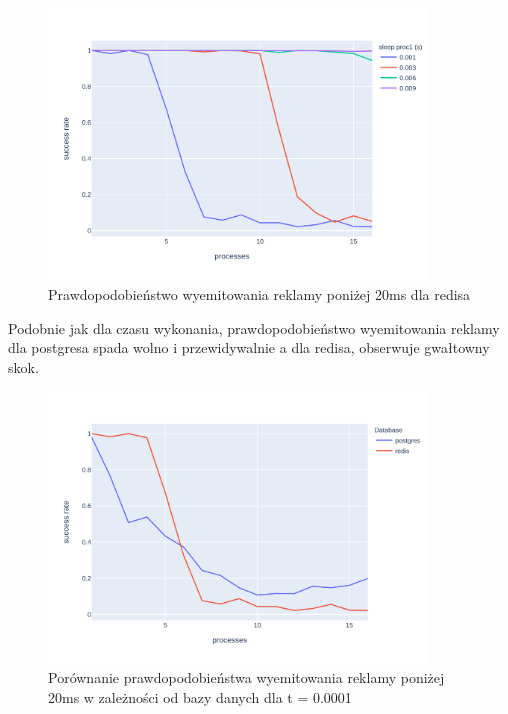 \documentclass[polish, 10pt]{article}
\begin{document}
\begin{figure}[H]
    \centering
    \includegraphics[width=0.9\textwidth]{./graphs/success_rate_redis_all_sleeps.png}
    \caption{Prawdopodobieństwo wyemitowania reklamy poniżej 20ms dla redisa}
\end{figure}

Podobnie jak dla czasu wykonania, prawdopodobieństwo wyemitowania reklamy dla postgresa spada wolno i przewidywalnie a dla redisa, obserwuje gwałtowny skok.

\begin{figure}[H]
    \centering
    \includegraphics[width=0.9\textwidth]{./graphs/success_rate_postgres_vs_redis_0001.png}
    \caption{Porównanie prawdopodobieństwa wyemitowania reklamy poniżej 20ms w zależności od bazy danych dla t = 0.0001}
\end{figure}
\end{document}
